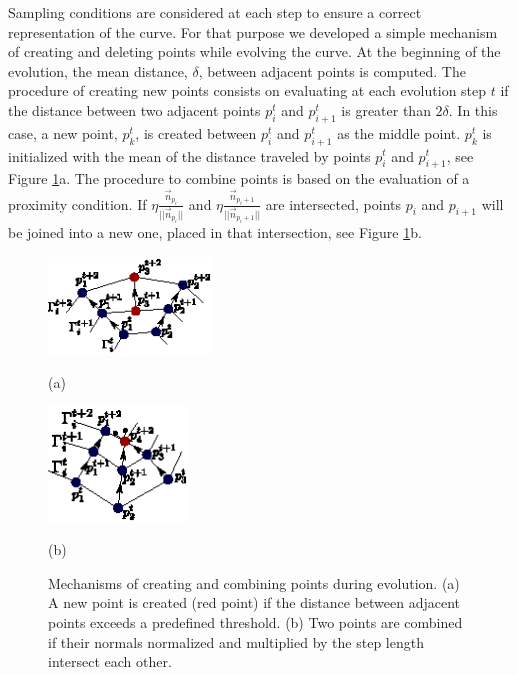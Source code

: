 \documentclass{article}
\begin{document}
Sampling conditions are considered at each step to ensure a correct representation of the curve. For that purpose we developed a simple mechanism of creating and deleting points while evolving the curve. At the beginning of the evolution, the mean distance, $\delta$, between adjacent points is computed. The procedure of creating new points consists on evaluating at each evolution step $t$ if the distance between two adjacent points $p_i^t$ and $p_{i+1}^t$ is greater than $2\delta$. In this case, a new point, $p_k^t$, is created between $p_i^t$ and $p_{i+1}^t$ as the middle point. $p_k^t$ is initialized with the mean of the distance traveled by points $p_i^t$ and $p_{i+1}^t$, see Figure \ref{fig:nacimiento_y_muerte}a. The procedure to combine points is based on the evaluation of a proximity condition. If $\eta\frac{\vec{n}_{p_i}}{||\vec{n}_{p_i}||}$ and $\eta\frac{\vec{n}_{p_i+1}}{||\vec{n}_{p_i+1}||}$ are intersected, points $p_i$ and $p_{i+1}$ will be joined into a new one, placed in that intersection, see Figure \ref{fig:nacimiento_y_muerte}b.
\begin{figure}[t]
\begin{minipage}[b]{.5\linewidth}
  \centering
  \centerline{\includegraphics[width=4.3cm]{pics/nacimiento}}
  \centerline{(a)}\medskip
\end{minipage}
\hfill
\begin{minipage}[b]{.48\linewidth}
  \centering
  \centerline{\includegraphics[width=3.7cm]{pics/muerte}}
  \centerline{(b)}\medskip
\end{minipage}
\caption{Mechanisms of creating and combining points during evolution. (a) A new point is created (red point) if the distance between adjacent points exceeds a predefined threshold. (b) Two points are combined if their normals normalized and multiplied by the step length intersect each other.}
\label{fig:nacimiento_y_muerte}
\end{figure}
\end{document}
